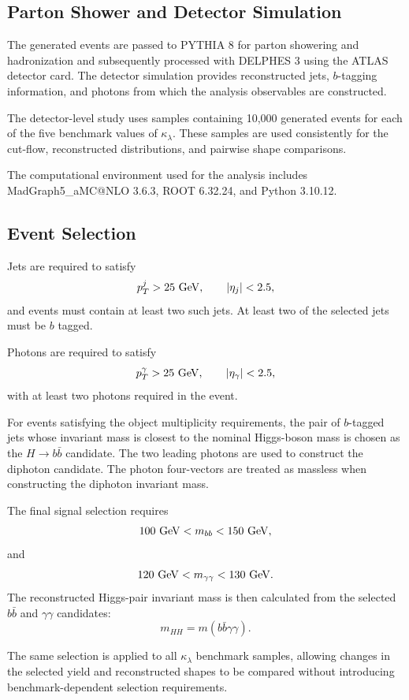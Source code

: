 \documentclass[11pt,a4paper]{article}
\begin{document}
\subsection{Parton Shower and Detector Simulation}

The generated events are passed to PYTHIA 8 for parton showering and hadronization and subsequently processed with DELPHES 3 using the ATLAS detector card. The detector simulation provides reconstructed jets, $b$-tagging information, and photons from which the analysis observables are constructed.

The detector-level study uses samples containing 10,000 generated events for each of the five benchmark values of $\kappa_\lambda$. These samples are used consistently for the cut-flow, reconstructed distributions, and pairwise shape comparisons.

The computational environment used for the analysis includes MadGraph5\_aMC@NLO 3.6.3, ROOT 6.32.24, and Python 3.10.12.

\subsection{Event Selection}

Jets are required to satisfy
\[
p_T^j>25~{\rm GeV},
\qquad
|\eta_j|<2.5,
\]
and events must contain at least two such jets. At least two of the selected jets must be $b$ tagged.

Photons are required to satisfy
\[
p_T^\gamma>25~{\rm GeV},
\qquad
|\eta_\gamma|<2.5,
\]
with at least two photons required in the event.

For events satisfying the object multiplicity requirements, the pair of $b$-tagged jets whose invariant mass is closest to the nominal Higgs-boson mass is chosen as the $H\to b\bar b$ candidate. The two leading photons are used to construct the diphoton candidate. The photon four-vectors are treated as massless when constructing the diphoton invariant mass.

The final signal selection requires
\[
100~{\rm GeV}<m_{bb}<150~{\rm GeV},
\]
and
\[
120~{\rm GeV}<m_{\gamma\gamma}<130~{\rm GeV}.
\]
The reconstructed Higgs-pair invariant mass is then calculated from the selected $b\bar b$ and $\gamma\gamma$ candidates:
\[
m_{HH}=m(b\bar b\gamma\gamma).
\]

The same selection is applied to all $\kappa_\lambda$ benchmark samples, allowing changes in the selected yield and reconstructed shapes to be compared without introducing benchmark-dependent selection requirements.
\end{document}
